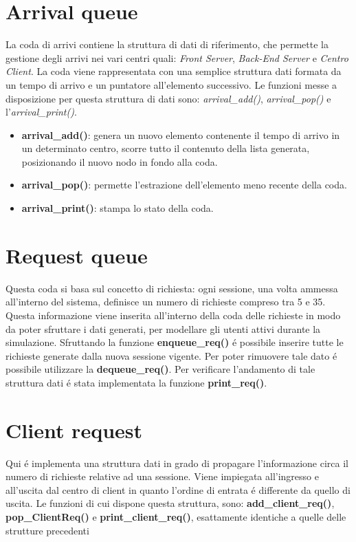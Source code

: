 \section{Arrival queue}
La coda di arrivi contiene la struttura di dati di riferimento, che permette la 
gestione degli arrivi nei vari centri quali: \textit{Front Server}, 
\textit{Back-End Server} e \textit{Centro Client}. La coda viene rappresentata 
con una semplice struttura dati formata da un tempo di arrivo e un puntatore 
all'elemento successivo. Le funzioni messe a disposizione per questa struttura 
di dati sono: \textit{arrival\_add()}, \textit{arrival\_pop()} e 
l'\textit{arrival\_print()}.
\begin{itemize}
\item \textbf{arrival\_add()}: genera un nuovo elemento contenente il tempo di 
arrivo in un determinato centro, scorre tutto il contenuto della lista generata, 
posizionando il nuovo nodo in fondo alla coda.
\item \textbf{arrival\_pop()}: permette l'estrazione dell'elemento meno recente 
della coda.
\item \textbf{arrival\_print()}: stampa lo stato della coda.
\end{itemize}

\section{Request queue}
Questa coda si basa sul concetto di richiesta: ogni sessione, una 
volta ammessa all'interno del sistema, definisce un numero di richieste compreso 
tra 5 e 35. Questa informazione viene inserita all'interno della coda delle 
richieste in modo da poter sfruttare i dati generati, per modellare gli utenti 
attivi durante la simulazione.
Sfruttando la funzione \textbf{enqueue\_req()} \'e possibile inserire tutte le 
richieste generate dalla nuova sessione vigente. Per poter rimuovere tale dato 
\'e possibile  utilizzare la \textbf{dequeue\_req()}.
Per verificare l'andamento di tale struttura dati \'e stata implementata la 
funzione \textbf{print\_req()}.

\section{Client request}
Qui \'e implementa una struttura dati in grado di propagare 
l'informazione circa il numero di richieste relative ad una sessione. Viene 
impiegata all'ingresso e all'uscita dal centro di client in quanto 
l'ordine di entrata \'e differente da quello di uscita.
Le funzioni di cui dispone questa struttura, sono: 
\textbf{add\_client\_req()}, \textbf{pop\_ClientReq()} e 
\textbf{print\_client\_req()}, esattamente identiche a quelle delle strutture precedenti


